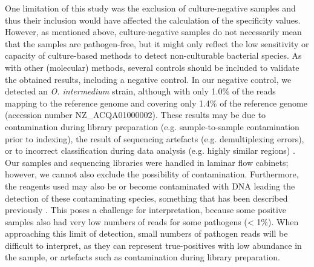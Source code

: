 One limitation of this study was the exclusion of culture-negative samples and thus their inclusion would have affected the calculation of the specificity values. However, as mentioned above, culture-negative samples do not necessarily mean that the samples are pathogen-free, but it might only reflect the low sensitivity or capacity of culture-based methods to detect non-culturable bacterial species. As with other (molecular) methods, several controls should be included to validate the obtained results, including a negative control. In our negative control, we detected an \textit{O. intermedium} strain, although with only 1.0\% of the reads mapping to the reference genome and covering only 1.4\% of the reference genome (accession number NZ\_ACQA01000002). These results may be due to contamination during library preparation (e.g. sample-to-sample contamination prior to indexing), the result of sequencing artefacts (e.g. demultiplexing errors), or to incorrect classification during data analysis (e.g. highly similar regions) \citep{graf_unbiased_2016}. Our samples and sequencing libraries were handled in laminar flow cabinets; however, we cannot also exclude the possibility of contamination. Furthermore, the reagents used may also be or become contaminated with DNA leading the detection of these contaminating species, something that has been described previously \citep{street_molecular_2017}. This poses a challenge for interpretation, because some positive samples also had very low numbers of reads for some pathogens (< 1\%). When approaching this limit of detection, small numbers of pathogen reads will be difficult to interpret, as they can represent true-positives with low abundance in the sample, or artefacts such as contamination during library preparation\citep{graf_unbiased_2016}.

